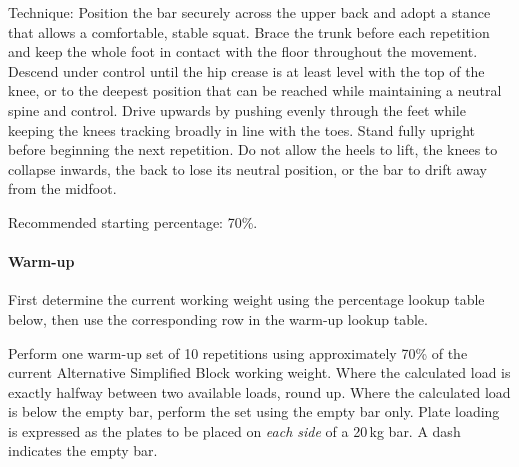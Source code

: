 \documentclass[11pt,a4paper]{article}
\begin{document}
Technique: Position the bar securely across the upper back and adopt a stance that allows a comfortable, stable squat. Brace the trunk before each repetition and keep the whole foot in contact with the floor throughout the movement. Descend under control until the hip crease is at least level with the top of the knee, or to the deepest position that can be reached while maintaining a neutral spine and control. Drive upwards by pushing evenly through the feet while keeping the knees tracking broadly in line with the toes. Stand fully upright before beginning the next repetition. Do not allow the heels to lift, the knees to collapse inwards, the back to lose its neutral position, or the bar to drift away from the midfoot.

Recommended starting percentage: 70\%.

\paragraph{Warm-up}

First determine the current working weight using the percentage lookup table below, then use the corresponding row in the warm-up lookup table.

Perform one warm-up set of 10 repetitions using approximately 70\% of the current Alternative Simplified Block working weight. Where the calculated load is exactly halfway between two available loads, round up. Where the calculated load is below the empty bar, perform the set using the empty bar only. Plate loading is expressed as the plates to be placed on \emph{each side} of a 20\,kg bar. A dash indicates the empty bar.
\end{document}
